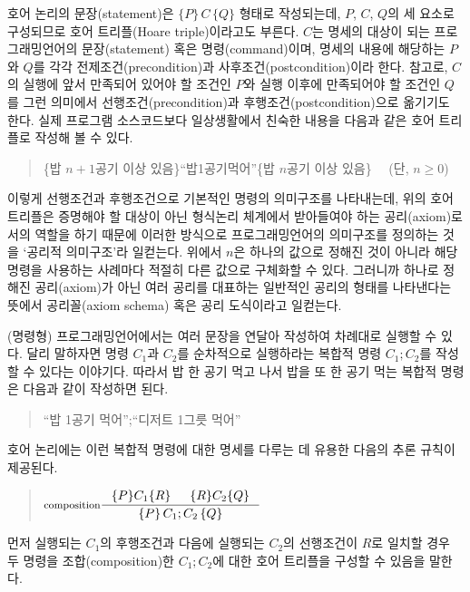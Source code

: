 호어 논리의 문장(statement)은 $\{P\}\,C\,\{Q\}$ 형태로 작성되는데,
$P$, $C$, $Q$의 세 요소로 구성되므로 호어 트리플(Hoare triple)이라고도
부른다. $C$는 명세의 대상이 되는 프로그래밍언어의 문장(statement) 혹은
명령(command)이며, 명세의 내용에 해당하는 ${P}$와 ${Q}$를 각각
전제조건(precondition)과 사후조건(postcondition)이라 한다.
참고로, $C$의 실행에 앞서 만족되어 있어야 할 조건인 $P$와
실행 이후에 만족되어야 할 조건인 $Q$를 그런 의미에서
선행조건(precondition)과 후행조건(postcondition)으로 옮기기도 한다.
실제 프로그램 소스코드보다 일상생활에서 친숙한 내용을 다음과 같은
호어 트리플로 작성해 볼 수 있다.
\begin{quote}\small
\{밥 $n+1$공기 이상 있음\}\;``밥\;1공기\;먹어''\;\{밥 $n$공기 이상 있음\}
~~(단, $n\ge 0$)
\end{quote}
이렇게 선행조건과 후행조건으로 기본적인 명령의 의미구조를 나타내는데,
위의 호어 트리플은 증명해야 할 대상이 아닌 형식논리 체계에서
받아들여야 하는 공리(axiom)로서의 역할을 하기 때문에 이러한 방식으로
프로그래밍언어의 의미구조를 정의하는 것을 `공리적 의미구조'라
일컫는다. 위에서 $n$은 하나의 값으로 정해진 것이 아니라 해당 명령을
사용하는 사례마다 적절히 다른 값으로 구체화할 수 있다. 그러니까 하나로
정해진 공리(axiom)가 아닌 여러 공리를 대표하는 일반적인 공리의 형태를
나타낸다는 뜻에서 공리꼴(axiom schema) 혹은 공리 도식이라고 일컫는다.

(명령형) 프로그래밍언어에서는 여러 문장을 연달아 작성하여 차례대로
실행할 수 있다. 달리 말하자면 명령 $C_1$과 $C_2$를 순차적으로 실행하라는
복합적 명령 $C_1;C_2$를 작성할 수 있다는 이야기다. 따라서 밥 한 공기
먹고 나서 밥을 또 한 공기 먹는 복합적 명령은 다음과 같이 작성하면 된다.
\begin{quote}\small
``밥 1공기 먹어'';``디저트 1그릇 먹어''
\end{quote}
호어 논리에는 이런 복합적 명령에 대한 명세를 다루는 데 유용한
다음의 추론 규칙이 제공된다.
\begin{quote}
\( \inference[composition]{ \{P\}C_1\{R\} & \{R\}C_2\{Q\} }{
                            \{P\}\,C_1;C_2\,\{Q\} } \)
\end{quote}
먼저 실행되는 $C_1$의 후행조건과 다음에 실행되는 $C_2$의 선행조건이
$R$로 일치할 경우 두 명령을 조합(composition)한 $C_1;C_2$에 대한
호어 트리플을 구성할 수 있음을 말한다.

